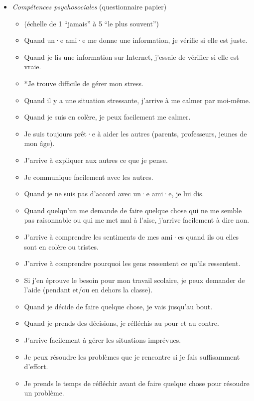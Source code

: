 \documentclass[
]{article}
\begin{document}
\begin{itemize}
\item
  \emph{Compétences psychosociales} (questionnaire papier)

  \begin{itemize}
  \item
    (échelle de 1 ``jamais'' à 5 ``le plus souvent'')
  \item
    Quand un·e ami·e me donne une information, je vérifie si elle est juste.
  \item
    Quand je lis une information sur Internet, j'essaie de vérifier si elle est vraie.
  \item
    *Je trouve difficile de gérer mon stress.
  \item
    Quand il y a une situation stressante, j'arrive à me calmer par moi-même.
  \item
    Quand je suis en colère, je peux facilement me calmer.
  \item
    Je suis toujours prêt·e à aider les autres (parents, professeurs, jeunes de mon âge).
  \item
    J'arrive à expliquer aux autres ce que je pense.
  \item
    Je communique facilement avec les autres.
  \item
    Quand je ne suis pas d'accord avec un·e ami·e, je lui dis.
  \item
    Quand quelqu'un me demande de faire quelque chose qui ne me semble pas raisonnable ou qui me met mal à l'aise, j'arrive facilement à dire non.
  \item
    J'arrive à comprendre les sentiments de mes ami·es quand ils ou elles sont en colère ou tristes.
  \item
    J'arrive à comprendre pourquoi les gens ressentent ce qu'ils ressentent.
  \item
    Si j'en éprouve le besoin pour mon travail scolaire, je peux demander de l'aide (pendant et/ou en dehors la classe).
  \item
    Quand je décide de faire quelque chose, je vais jusqu'au bout.
  \item
    Quand je prends des décisions, je réfléchis au pour et au contre.
  \item
    J'arrive facilement à gérer les situations imprévues.
  \item
    Je peux résoudre les problèmes que je rencontre si je fais suffisamment d'effort.
  \item
    Je prends le temps de réfléchir avant de faire quelque chose pour résoudre un problème.

\end{itemize}
\end{itemize}
\end{document}

